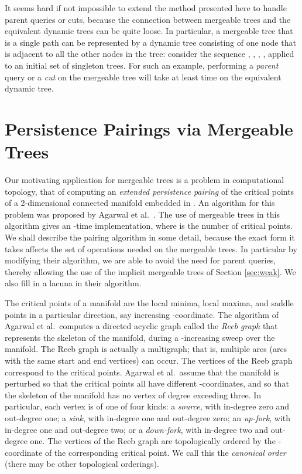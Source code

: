 \documentclass[twoside,leqno,twocolumn]{article}
\begin{document}
It seems hard if not impossible to extend the method presented here to handle parent queries or cuts, because the connection between mergeable trees and the equivalent dynamic trees can be quite loose.  In particular, a mergeable tree that is a single path can be represented by a dynamic tree consisting of one node that is adjacent to all the other nodes in the tree: consider the sequence , , , ,  applied to an initial set of singleton trees.  For such an example, performing a \emph{parent} query or a \emph{cut} on the mergeable tree will take at least  time on the equivalent dynamic tree.



\section{Persistence Pairings via Mergeable Trees}
\label{sec:pairing}

Our motivating application for mergeable trees is a problem in computational topology, that of computing an \emph{extended persistence pairing} of the critical points of a 2-dimensional connected manifold embedded in .  An algorithm for this problem was proposed by Agarwal et al.~\cite{AEHW04,AEHW06}.  The use of mergeable trees in this algorithm gives an -time implementation, where  is the number of critical points.  We shall describe the pairing algorithm in some detail, because the exact form it takes affects the set of operations needed on the mergeable trees.  In particular by modifying their algorithm, we are able to avoid the need for parent queries, thereby allowing the use of the implicit mergeable trees of Section \ref{sec:weak}.  We also fill in a lacuna in their algorithm.

The critical points of a manifold are the local minima, local maxima, and saddle points in a particular direction, say increasing -coordinate.  The algorithm of Agarwal et al.\ computes a directed acyclic graph called the \emph{Reeb graph} that represents the skeleton of the manifold, during a -increasing sweep over the manifold.  The Reeb graph is actually a multigraph; that is, multiple arcs (arcs with the same start and end vertices) can occur. The vertices of the Reeb graph correspond to the critical points. Agarwal et al.\ assume that the manifold is perturbed so that the critical points all have different -coordinates, and so that the skeleton of the manifold has no vertex of degree exceeding three. In particular, each vertex is of one of four kinds: a \emph{source}, with in-degree zero and out-degree one; a \emph{sink}, with in-degree one and out-degree zero; an \emph{up-fork}, with in-degree one and out-degree two; or a \emph{down-fork}, with in-degree two and out-degree one.  The vertices of the Reeb graph are topologically ordered by the -coordinate of the corresponding critical point. We call this the \emph{canonical order} (there may be other topological orderings).
\end{document}
